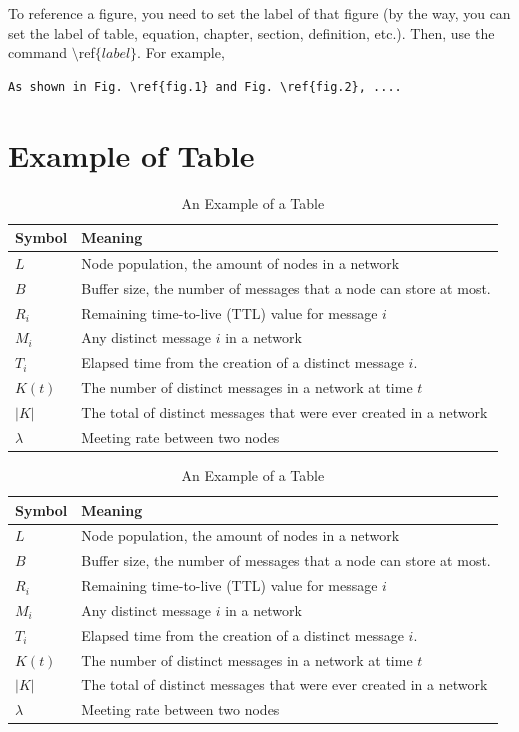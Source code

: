 To reference a figure, you need to set the label of that figure (by the way, you can set the label of table, equation, chapter, section, definition, etc.).
Then, use the command $\setminus$ref$\{label\}$. For example,
\begin{lstlisting}[language=Tex]
As shown in Fig. \ref{fig.1} and Fig. \ref{fig.2}, ....
\end{lstlisting}




\section{Example of Table}

\begin{table}[!tb]
\renewcommand{\arraystretch}{1}
\caption{An Example of a Table}
\label{table1}
\centering%
\begin{tabular}{|l|l|}
\hline
Symbol & Meaning \\ \hline
$L$ & Node population, the amount of nodes in a network \\
$B$ & Buffer size, the number of messages that a node can store at most. \\
$R_i$ & Remaining time-to-live (TTL) value for message $i$\\
$M_i$ & Any distinct message $i$ in a network\\
$T_i$ & Elapsed time from the creation of a distinct message $i$.\\
$K(t)$ & The number of distinct messages in a network at time $t$\\
$\vert K\vert$ & The total of distinct messages that were ever created in a network\\
$\lambda$ & Meeting rate between two nodes\\
\hline
\end{tabular}%
\end{table}

\begin{table}[!tb]
\renewcommand{\arraystretch}{1}
\caption{An Example of a Table}
\label{table2}
\centering%
\begin{tabular}{lp{10cm}}
\hline
Symbol & Meaning \\ \hline
$L$ & Node population, the amount of nodes in a network \\
$B$ & Buffer size, the number of messages that a node can store at most. \\
$R_i$ & Remaining time-to-live (TTL) value for message $i$\\
$M_i$ & Any distinct message $i$ in a network\\
$T_i$ & Elapsed time from the creation of a distinct message $i$.\\
$K(t)$ & The number of distinct messages in a network at time $t$\\
$\vert K\vert$ & The total of distinct messages that were ever created in a network\\
$\lambda$ & Meeting rate between two nodes\\
\hline
\end{tabular}%
\end{table}

